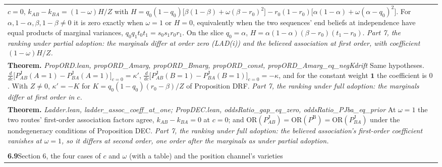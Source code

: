 \documentclass[10pt]{article}
\theoremstyle{definition}
\newcommand{\PB}{P^{\mathrm{B}}}
\newcommand{\PJ}{P^{\mathrm{J}}}
\newlength{\fullw}\setlength{\fullw}{25.9cm}
\newcommand{\entryhead}[2]{\multicolumn{3}{|l|}{\rule{0pt}{2.6ex}\large\textbf{#1}\quad #2} \\ \hline}
\begin{document}
{\begin{longtable}{|p{0.9cm}|p{12.2cm}|p{12.2cm}|}
{$c=0$, $k_{AB}-k_{BA}=(1-\omega)H/Z$ with
$H=q_0(1-q_0)\bigl[\beta(1-\beta)+\omega(\beta-r_0)^2\bigr]-r_0(1-r_0)\bigl[\alpha(1-\alpha)+\omega(\alpha-q_0)^2\bigr]$.
For $\alpha,1-\alpha,\beta,1-\beta\neq0$ it is zero exactly when $\omega=1$ or $H=0$,
equivalently when the two sequences' end beliefs at independence have equal products of
marginal variances, $q_0q_1t_0t_1=s_0s_1r_0r_1$. On the slice $q_0=\alpha$,
$H=\alpha(1-\alpha)(\beta-r_0)(t_1-r_0)$. \newline \textit{Part 7, the ranking under partial adoption: the marginals differ at order zero (LAD(i)) and the believed association at first order, with coefficient $(1-\omega)H/Z$.}} \\
\multicolumn{3}{|p{\fullw}|}{\textbf{Theorem.} \textit{PropORD.lean, propORD\_Amarg, propORD\_Bmarg, propORD\_const, propORD\_Amarg\_eq\_negKdrift} \newline Same hypotheses. $\frac{d}{dc}\bigl[\PJ_{AB}(A{=}1)-\PJ_{BA}(A{=}1)\bigr]_{c=0}=\kappa'$,
$\frac{d}{dc}\bigl[\PJ_{AB}(B{=}1)-\PJ_{BA}(B{=}1)\bigr]_{c=0}=-\kappa$, and for the
constant weight $\mathbf 1$ the coefficient is $0$. With $Z\neq0$,
$\kappa'=-K$ for $K=q_0(1-q_0)(r_0-\beta)/Z$ of Proposition DRF. \newline \textit{Part 7, the ranking under full adoption: the marginals differ at first order in $c$.}} \\
\multicolumn{3}{|p{\fullw}|}{\textbf{Theorem.} \textit{Ladder.lean, ladder\_assoc\_coeff\_at\_one; PropDEC.lean, oddsRatio\_gap\_eq\_zero, oddsRatio\_PJba\_eq\_prior} \newline At $\omega=1$ the two routes' first-order association factors agree,
$k_{AB}-k_{BA}=0$ at $c=0$; and $\mathrm{OR}(\PJ_{AB})=\mathrm{OR}(\PB)=\mathrm{OR}(\PJ_{BA})$
under the nondegeneracy conditions of Proposition DEC. \newline \textit{Part 7, the ranking under full adoption: the believed association's first-order coefficient vanishes at $\omega=1$, so it differs at second order, one order after the marginals as under partial adoption.}} \\ \hline
\multicolumn{3}{|l|}{} \\ \hline
\entryhead{6.9}{Section 6, the four cases of $c$ and $\omega$ (with a table) and the position channel's varieties\quad{\footnotesize\textit{(formerly C.27)}}}

\end{longtable}}
\end{document}
